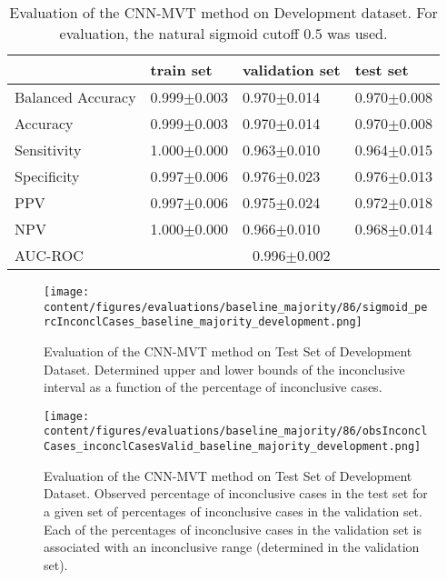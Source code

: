 \begin{table}[ht]
  \caption{Evaluation of the CNN-MVT method on Development dataset. 
  For evaluation, the natural sigmoid cutoff $0.5$ was used.}
  \centering
  \begin{tabular}{llll}
      \hline
                        & train set         & validation set      & test set             \\
      \hline
      Balanced Accuracy & 0.999$\pm$0.003   &  0.970$\pm$0.014    &  0.970$\pm$0.008   \\
      Accuracy          & 0.999$\pm$0.003    &   0.970$\pm$0.014   &  0.970$\pm$0.008   \\
      Sensitivity       &  1.000$\pm$0.000   &   0.963$\pm$0.010   &  0.964$\pm$0.015  \\
      Specificity       &   0.997$\pm$0.006   &   0.976$\pm$0.023  &   0.976$\pm$0.013  \\
      PPV               &  0.997$\pm$0.006   &   0.975$\pm$0.024   &  0.972$\pm$0.018 \\
      NPV               &  1.000$\pm$0.000    &   0.966$\pm$0.010   & 0.968$\pm$0.014  \\
      \hline
      AUC-ROC          &  \multicolumn{3}{c}{0.996$\pm$0.002}  \\
      \hline
  \end{tabular}
 \label{t1:cnn_mvt_perf_eval_table}
\end{table}


\begin{figure}[t]
  \centering
  \texttt{[image: content/figures/evaluations/baseline\_majority/86/sigmoid\_percInconclCases\_baseline\_majority\_development.png]}
  \caption{Evaluation of the CNN-MVT method on Test Set of Development Dataset. 
  Determined upper and lower bounds of the inconclusive interval as a function of the percentage of inconclusive cases.} 
  \label{fig:baseline_majority_percInconclCases_development}
\end{figure}


\begin{figure}[h]
  \centering
  \texttt{[image: content/figures/evaluations/baseline\_majority/86/obsInconclCases\_inconclCasesValid\_baseline\_majority\_development.png]}
  \caption{Evaluation of the CNN-MVT method on Test Set of Development Dataset.
  Observed percentage of inconclusive cases in the test set 
  for a given set of percentages of inconclusive cases in the validation set.
  Each of the percentages of inconclusive cases in the validation set is associated 
  with an inconclusive range (determined in the validation set).} 
  \label{fig:obsInconclCases_inconclCasesValid_baseline_majority_development}
\end{figure} 


